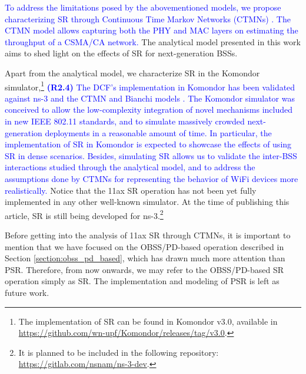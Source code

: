 \documentclass{ieeeaccess}
\begin{document}
\textcolor{blue}{To address the limitations posed by the abovementioned models, we propose characterizing SR through Continuous Time Markov Networks (CTMNs) \cite{bellalta2014throughput, bellalta2017throughput}. The CTMN model allows capturing both the PHY and MAC layers on estimating the throughput of a CSMA/CA network.} The analytical model presented in this work aims to shed light on the effects of SR for next-generation BSSs.

Apart from the analytical model, we characterize SR in the Komondor simulator,\footnote{The implementation of SR can be found in Komondor v3.0, available in \url{https://github.com/wn-upf/Komondor/releases/tag/v3.0}.} \textcolor{blue}{\textbf{(R2.4)} The DCF's implementation in Komondor has been validated against ns-3 and the CTMN and Bianchi models \cite{barrachina2019komondor}. The Komondor simulator was conceived to allow the low-complexity integration of novel mechanisms included in new IEEE 802.11 standards, and to simulate massively crowded next-generation deployments in a reasonable amount of time. In particular, the implementation of SR in Komondor is expected to showcase the effects of using SR in dense scenarios. Besides, simulating SR allows us to validate the inter-BSS interactions studied through the analytical model, and to address the assumptions done by CTMNs for representing the behavior of WiFi devices more realistically.} Notice that the 11ax SR operation has not been yet fully implemented in any other well-known simulator. At the time of publishing this article, SR is still being developed for ns-3.\footnote{It is planned to be included in the following repository: \url{https://gitlab.com/nsnam/ns-3-dev}.}

Before getting into the analysis of 11ax SR through CTMNs, it is important to mention that we have focused on the OBSS/PD-based operation described in Section \ref{section:obss_pd_based}, which has drawn much more attention than PSR. Therefore, from now onwards, we may refer to the OBSS/PD-based SR operation simply as SR. The implementation and modeling of PSR is left as future work.
\end{document}
